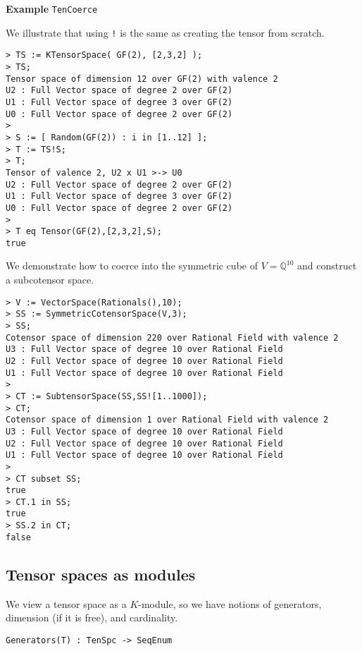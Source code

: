 \begin{framed}{\bf Example} {\tt TenCoerce}\\
{\small We illustrate that using {\tt !} is the same as creating the tensor from scratch.
\begin{lstlisting}[frame=single,basicstyle=\ttfamily\color{black!30!
teal},backgroundcolor=\color{white!70!gray}]
> TS := KTensorSpace( GF(2), [2,3,2] );
> TS;
Tensor space of dimension 12 over GF(2) with valence 2
U2 : Full Vector space of degree 2 over GF(2)
U1 : Full Vector space of degree 3 over GF(2)
U0 : Full Vector space of degree 2 over GF(2)
> 
> S := [ Random(GF(2)) : i in [1..12] ];
> T := TS!S;
> T;
Tensor of valence 2, U2 x U1 >-> U0
U2 : Full Vector space of degree 2 over GF(2)
U1 : Full Vector space of degree 3 over GF(2)
U0 : Full Vector space of degree 2 over GF(2)
> 
> T eq Tensor(GF(2),[2,3,2],S);
true
\end{lstlisting}
We demonstrate how to coerce into the symmetric cube of $V=\mathbb{Q}^{10}$ and construct a subcotensor space.
\begin{lstlisting}[frame=single,basicstyle=\ttfamily\color{black!30!
teal},backgroundcolor=\color{white!70!gray}]
> V := VectorSpace(Rationals(),10);
> SS := SymmetricCotensorSpace(V,3);
> SS;
Cotensor space of dimension 220 over Rational Field with valence 2
U3 : Full Vector space of degree 10 over Rational Field
U2 : Full Vector space of degree 10 over Rational Field
U1 : Full Vector space of degree 10 over Rational Field
> 
> CT := SubtensorSpace(SS,SS![1..1000]);
> CT;
Cotensor space of dimension 1 over Rational Field with valence 2
U3 : Full Vector space of degree 10 over Rational Field
U2 : Full Vector space of degree 10 over Rational Field
U1 : Full Vector space of degree 10 over Rational Field
> 
> CT subset SS;
true
> CT.1 in SS;
true
> SS.2 in CT;
false
\end{lstlisting}
}
\end{framed}

\subsection{Tensor spaces as modules}

We view a tensor space as a $K$-module, so we have notions of generators, 
dimension (if it is free), and cardinality.

\color{blue}
{\small \begin{verbatim}
Generators(T) : TenSpc -> SeqEnum
\end{verbatim} }
\color{black}

